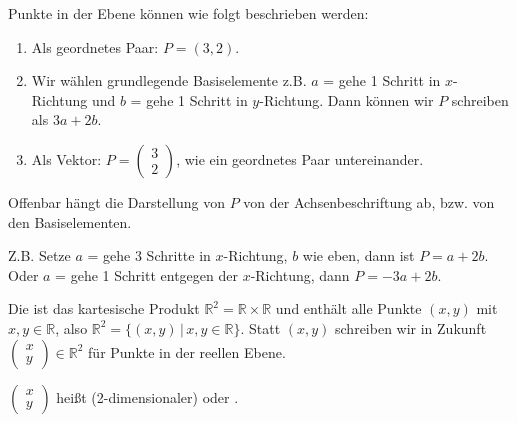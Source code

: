 \begin{center}
\end{center}

Punkte in der Ebene können wie folgt beschrieben werden:
\begin{enumerate}
	\item{Als geordnetes Paar: $P = (3, 2)$.}
	\item{Wir wählen \glqq{}grundlegende Basiselemente\grqq{} z.B. $a$ = \glqq{}gehe\grqq{} 1 Schritt in $x$-Richtung und $b$ = \glqq{}gehe\grqq{} 1 Schritt in $y$-Richtung. Dann können wir $P$ schreiben als $3a + 2b$.}
	\item{Als Vektor: $P = \begin{pmatrix}3 \\ 2\end{pmatrix}$, wie ein geordnetes Paar untereinander.}
\end{enumerate}

Offenbar hängt die Darstellung von $P$ von der Achsenbeschriftung ab, bzw. von den \glqq{}Basiselementen\grqq{}.

Z.B. Setze $a$ = \glqq{}gehe\grqq{} 3 Schritte in $x$-Richtung, $b$ wie eben, dann ist $P = a + 2b$. Oder $a$ = \glqq{}gehe\grqq{} 1 Schritt entgegen der $x$-Richtung, dann $P = -3a + 2b$.

Die  ist das kartesische Produkt $\mathbb{R}^2 = \mathbb{R} \times \mathbb{R}$ und enthält alle Punkte $(x, y)$ mit $x, y \in \mathbb{R}$, also $\mathbb{R}^2 = \{(x,y)\,|\,x,y \in \mathbb{R}\}$. Statt $(x, y)$ schreiben wir in Zukunft $\begin{pmatrix}x \\ y\end{pmatrix} \in \mathbb{R}^2$ für Punkte in der reellen Ebene.

$\begin{pmatrix}x \\ y\end{pmatrix}$ heißt (2-dimensionaler)  oder .

